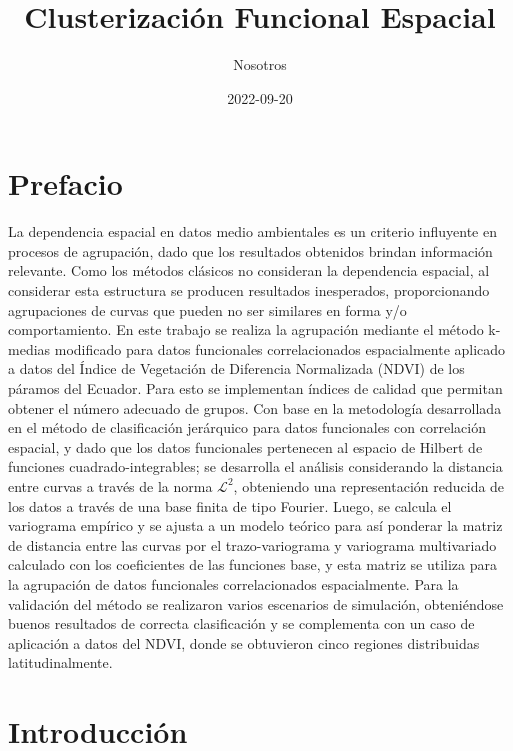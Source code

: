 \documentclass[
]{book}
\title{Clusterización Funcional Espacial}
\author{Nosotros}
\date{2022-09-20}
\begin{document}
\maketitle

{
\setcounter{tocdepth}{1}
\tableofcontents
}
\hypertarget{prefacio}{%
\chapter*{Prefacio}\label{prefacio}}

La dependencia espacial en datos medio ambientales es un criterio influyente en procesos de agrupación, dado que los resultados obtenidos brindan información relevante. Como los métodos clásicos no consideran la dependencia espacial, al considerar esta estructura se producen resultados inesperados, proporcionando agrupaciones de curvas que pueden no ser similares en forma y/o comportamiento. En este trabajo se realiza la agrupación mediante el método k-medias modificado para datos funcionales correlacionados espacialmente aplicado a datos del Índice de Vegetación de Diferencia Normalizada (NDVI) de los páramos del Ecuador. Para esto se implementan índices de calidad que permitan obtener el número adecuado de grupos. Con base en la metodología desarrollada en el método de clasificación jerárquico para datos funcionales con correlación espacial, y dado que los datos funcionales pertenecen al espacio de Hilbert de funciones cuadrado-integrables; se desarrolla el análisis considerando la distancia entre curvas a través de la norma \(\mathcal{L}^2\), obteniendo una representación reducida de los datos a través de una base finita de tipo Fourier. Luego, se calcula el variograma empírico y se ajusta a un modelo teórico para así ponderar la matriz de distancia entre las curvas por el trazo-variograma y variograma multivariado calculado con los coeficientes de las funciones base, y esta matriz se utiliza para la agrupación de datos funcionales correlacionados espacialmente. Para la validación del método se realizaron varios escenarios de simulación, obteniéndose buenos resultados de correcta clasificación y se complementa con un caso de aplicación a datos del NDVI, donde se obtuvieron cinco regiones distribuidas latitudinalmente.

\hypertarget{introducciuxf3n}{%
\chapter{Introducción}\label{introducciuxf3n}}
\end{document}
